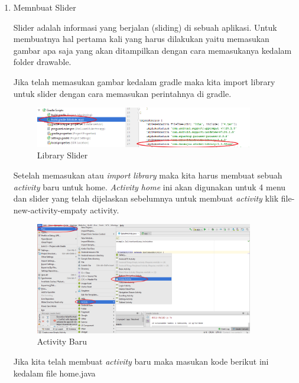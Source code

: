 \begin{enumerate}
    \item Memnbuat Slider 
    
    \par Slider adalah informasi yang berjalan (sliding) di sebuah aplikasi. Untuk membuatnya hal pertama kali yang harus dilakukan yaitu memasukan gambar apa saja yang akan ditampilkan dengan cara memasukanya kedalam folder drawable.
    
    \par Jika telah memasukan gambar kedalam gradle maka kita import library untuk slider dengan cara memasukan perintahnya di gradle.
    \begin{figure}[H]
        \centering
        \includegraphics[width=0.9\textwidth]{figures/android32.png}
        \caption{Library Slider}
        \label{print}
        \end{figure}
    \par Setelah memasukan atau \textit{import library} maka kita harus membuat sebuah \textit{activity} baru untuk home. \textit{Activity home} ini akan digunakan untuk 4 menu dan slider yang telah dijelaskan sebelumnya untuk membuat \textit{activity} klik file-new-activity-empaty activity.
    \begin{figure}[H]
        \centering
        \includegraphics[width=0.9\textwidth]{figures/android33.png}
        \caption{Activity Baru}
        \label{print}
        \end{figure}
        
    \par Jika kita telah membuat \textit{activity} baru maka masukan kode berikut ini kedalam file home.java



\end{enumerate}
